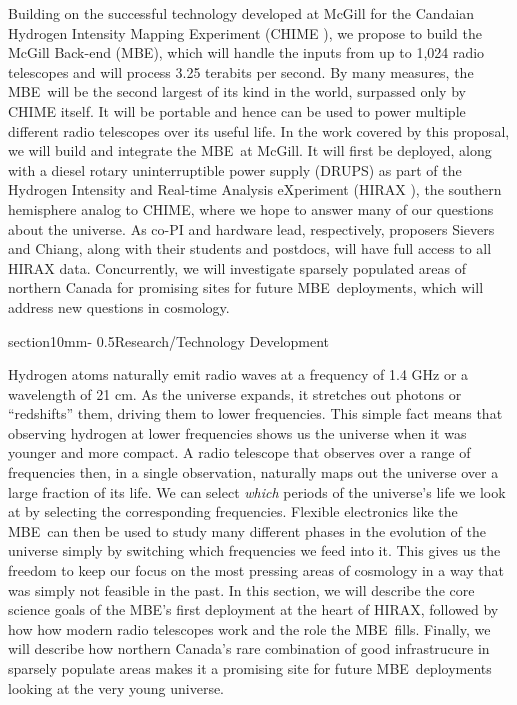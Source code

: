 \documentclass[letterpaper,11pt,preprint]{aastex}
\makeatletter
\newcommand{\mbe}{{\rm MBE}}
\renewcommand{\section}{\@startsection%
{section}{1}{0mm}{-\baselineskip}%
{0.5\baselineskip}{\normalfont\Large\bfseries}}%
\makeatother
\begin{document}
Building on the successful technology developed at McGill for the
Candaian Hydrogen Intensity Mapping Experiment (CHIME
\citet{Bandura16}), we propose to build the McGill Back-end (\mbe),
which will handle the inputs from up to 1,024 radio telescopes and
will process 3.25 terabits per second.  By many measures, the
\mbe\ will be the second largest of its kind in the world, surpassed
only by CHIME itself.  It will be portable and hence can be used to
power multiple different radio telescopes over its useful life. In the
work covered by this proposal, we will build and integrate the
\mbe\ at McGill.  It will first be deployed, along with a diesel
rotary uninterruptible power supply (DRUPS) as part of the Hydrogen
Intensity and Real-time Analysis eXperiment (HIRAX
\citet{Newburgh16}), the southern hemisphere analog to CHIME, where we
hope to answer many of our questions about the universe.  As co-PI and
hardware lead, respectively, proposers Sievers and Chiang, along with
their students and postdocs, will have full access to all HIRAX
data. Concurrently, we will investigate sparsely populated areas of
northern Canada for promising sites for future \mbe\ deployments,
which will address new questions in cosmology.

\section{Research/Technology Development}

Hydrogen atoms naturally emit radio waves at a frequency of 1.4 GHz or
a wavelength of 21 cm.  As the universe expands, it stretches out
photons or ``redshifts'' them, driving them to lower frequencies.
This simple fact means that observing hydrogen at lower frequencies
shows us the universe when it was younger and more compact.  A radio
telescope that observes over a range of frequencies then, in a single
observation, naturally maps out the universe over a large fraction of
its life.  We can select {\it{which}} periods of the universe's life
we look at by selecting the corresponding frequencies.  Flexible
electronics like the \mbe\ can then be used to study many different
phases in the evolution of the universe simply by switching which
frequencies we feed into it.  This gives us the freedom to keep our
focus on the most pressing areas of cosmology in a way that was simply
not feasible in the past.  In this section, we will describe the core
science goals of the \mbe's first deployment at the heart of HIRAX,
followed by how how modern radio telescopes work and the role the \mbe\ 
fills.  Finally, we will describe how northern Canada's rare
combination of good infrastrucure in sparsely populate areas makes it
a promising site for future \mbe\ deployments looking at the very young
universe.
\end{document}
